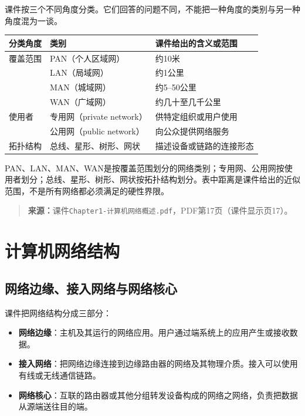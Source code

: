 课件按三个不同角度分类。它们回答的问题不同，不能把一种角度的类别与另一种角度混为一谈。

\begin{center}
\begin{tabularx}{0.96\textwidth}{l l X}
\toprule
分类角度 & 类别 & 课件给出的含义或范围\\
\midrule
覆盖范围 & PAN（个人区域网） & 约10米\\
 & LAN（局域网） & 约1公里\\
 & MAN（城域网） & 约5--50公里\\
 & WAN（广域网） & 约几十至几千公里\\
使用者 & 专用网（private network） & 供特定组织或用户使用\\
 & 公用网（public network） & 向公众提供网络服务\\
拓扑结构 & 总线、星形、树形、网状 & 描述设备或链路的连接形态\\
\bottomrule
\end{tabularx}
\end{center}

PAN、LAN、MAN、WAN是按覆盖范围划分的网络类别；专用网、公用网按使用者划分；总线、星形、树形、网状按拓扑结构划分。表中距离是课件给出的近似范围，不是所有网络都必须满足的硬性界限。

\begin{quote}\small\textbf{来源：}课件\texttt{Chapter1-计算机网络概述.pdf}，PDF第17页（课件显示页17）。\end{quote}
\annotationarea[4]

\section{计算机网络结构}

\subsection{网络边缘、接入网络与网络核心}

课件把网络结构分成三部分：
\begin{itemize}
  \item \textbf{网络边缘}：主机及其运行的网络应用。用户通过端系统上的应用产生或接收数据。
  \item \textbf{接入网络}：把网络边缘连接到边缘路由器的网络及其物理介质。接入可以使用有线或无线通信链路。
  \item \textbf{网络核心}：互联的路由器或其他分组转发设备构成的网络之网络，负责把数据从源端送往目的端。
\end{itemize}

